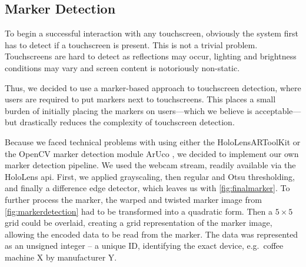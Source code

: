 \subsection{Marker Detection}
\label{subsec:markers}
To begin a successful interaction with any touchscreen, obviously the system first has to detect if a touchscreen is present.
This is not a trivial problem.
Touchscreens are hard to detect as reflections may occur, lighting and brightness conditions may vary and screen content is notoriously non-static.


Thus, we decided to use a marker-based approach to touchscreen detection, where users are required to put markers next to touchscreens.
This places a small burden of initially placing the markers on users---which we believe is acceptable---but drastically reduces the complexity of touchscreen detection.

Because we faced technical problems with using either the HoloLensARToolKit \cite{artoolkit}  or the OpenCV marker detection module ArUco \cite{aruco}, we decided to implement our own marker detection pipeline.
We used the webcam stream, readily available via the HoloLens \ac{api}.
First, we applied grayscaling, then regular and Otsu thresholding, and finally a difference edge detector, which leaves us with \autoref{fig:finalmarker}.
To further process the marker, the warped and twisted marker image from \autoref{fig:markerdetection} had to be transformed into a quadratic form.
Then a $5\times5$ grid could be overlaid, creating a grid representation of the marker image, allowing the encoded data to be read from the marker.
The data was represented as an unsigned integer -- a unique ID, identifying the exact device, e.g.\ coffee machine X by manufacturer Y.

